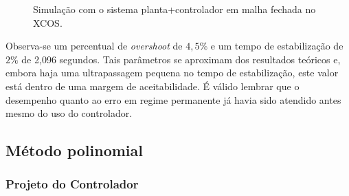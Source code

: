 \begin{figure}[H]
\begin{center}
\end{center}
\caption{Simulação com o sistema planta+controlador em malha fechada no XCOS.}
\label{xcos:mrl} 
\end{figure}

Observa-se um percentual de \textit{overshoot} de $4,5\%$ e um tempo de estabilização de $2\%$ de 2,096 segundos. Tais parâmetros se aproximam dos resultados teóricos e, embora haja uma ultrapassagem pequena no tempo de estabilização, este valor está dentro de uma margem de aceitabilidade. É válido lembrar que o desempenho quanto ao erro em regime permanente já havia sido atendido antes mesmo do uso do controlador.

\subsection{Método polinomial}

\subsubsection{Projeto do Controlador}

